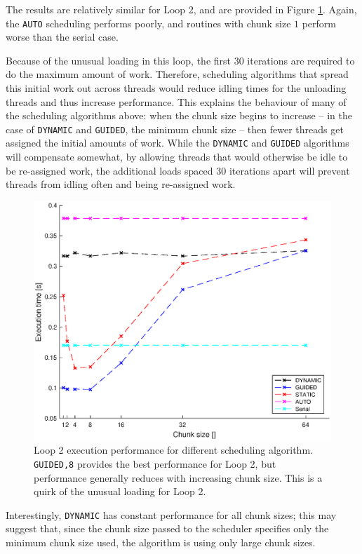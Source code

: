 \documentclass{article} %
\newcommand{\tp}{\texttt}
\begin{document}
The results are relatively similar for Loop 2, and are provided in Figure \ref{fig:loop2results}. 
Again, the \tp{AUTO} scheduling performs poorly, and routines with chunk size $1$ perform worse than the serial case.

Because of the unusual loading in this loop, the first 30 iterations are required to do the maximum amount of work.
Therefore, scheduling algorithms that spread this initial work out across threads would reduce idling times for the unloading threads and thus increase performance.
This explains the behaviour of many of the scheduling algorithms above: when the chunk size begins to increase -- in the case of \tp{DYNAMIC} and \tp{GUIDED}, the minimum chunk size -- then fewer threads get assigned the initial amounts of work.
While the \tp{DYNAMIC} and \tp{GUIDED} algorithms will compensate somewhat, by allowing threads that would otherwise be idle to be re-assigned work, the additional loads spaced 30 iterations apart will prevent threads from idling often and being re-assigned work.

\begin{figure}
    \centering
    \includegraphics[height=.35\textheight]{part1_plots/all_part2.eps}
    \caption{Loop 2 execution performance for different scheduling algorithm. \tp{GUIDED,8} provides the best performance for Loop 2, but performance generally reduces with increasing chunk size.
    This is a quirk of the unusual loading for Loop 2.}
    \label{fig:loop2results}
\end{figure}

Interestingly, \tp{DYNAMIC} has constant performance for all chunk sizes; this may suggest that, since the chunk size passed to the scheduler specifies only the minimum chunk size used, the algorithm is using only large chunk sizes.
\end{document}
